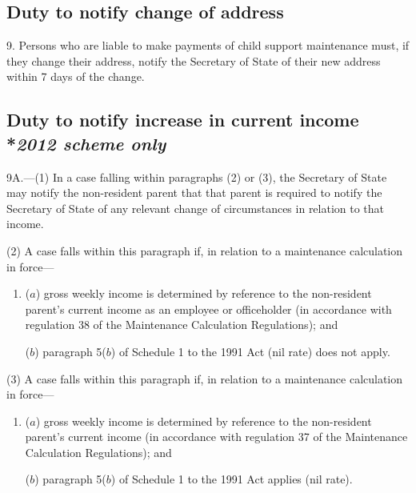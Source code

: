\documentclass[12pt,a4paper]{article}
\begin{document}

\subsection[9. Duty to notify change of address]{Duty to notify change of address}

9.  Persons who are liable to make payments of child support maintenance must, if they change their address, notify the 
Secretary of State  %
of their new address within 7 days of the change.


\subsection[9A. Duty to notify increase in current income]{Duty to notify increase in current income\\*\emph{2012 scheme only}}

9A.---(1)  In a case falling within paragraphs (2) or (3), the Secretary of State may notify the non-resident parent that that parent is required to notify the Secretary of State of any relevant change of circumstances in relation to that income.

(2) A case falls within this paragraph if, in relation to a maintenance calculation in force—
\begin{enumerate}\item[]
($a$) gross weekly income is determined by reference to the non-resident parent’s current income as an employee or officeholder (in accordance with regulation 38 of the Maintenance Calculation Regulations); and

($b$) paragraph 5($b$)  of Schedule 1 to the 1991 Act (nil rate) does not apply.
\end{enumerate}

(3) A case falls within this paragraph if, in relation to a maintenance calculation in force—
\begin{enumerate}\item[]
($a$) gross weekly income is determined by reference to the non-resident parent’s current income (in accordance with regulation 37 of the Maintenance Calculation Regulations); and

($b$) paragraph 5($b$)  of Schedule 1 to the 1991 Act applies (nil rate).
\end{enumerate}
\end{document}
